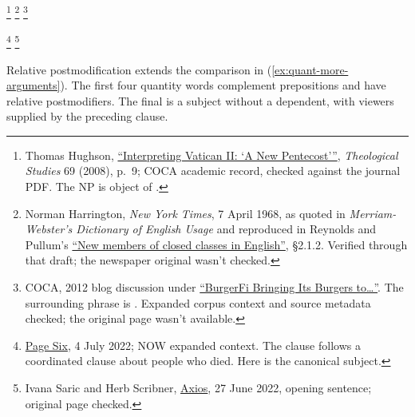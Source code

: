 \documentclass[12pt]{article}
\begin{document}
\ea\label{ex:quant-arguments}
\ea\label{ex:countless-part} \footnote{Thomas Hughson, \href{https://theologicalstudies.net/wp-content/uploads/2022/08/69.1.1.pdf\#page=7}{\enquote{Interpreting Vatican II: \enquote{A New Pentecost}}}, \textit{Theological Studies} 69 (2008), p.~9; COCA academic record, checked against the journal PDF. The NP is object of .}
\ex\label{ex:numerous-part} \footnote{Norman Harrington, \textit{New York Times}, 7 April 1968, as quoted in \textit{Merriam-Webster's Dictionary of English Usage} and reproduced in Reynolds and Pullum's \href{https://www.lel.ed.ac.uk/~gpullum/ClosedClasses.pdf}{\enquote{New members of closed classes in English}}, §2.1.2. Verified through that draft; the newspaper original wasn't checked.}
\ex\label{ex:multiple-part} \footnote{COCA, 2012 blog discussion under \href{http://www.tonetoatl.com/2012/08/burgerfi-bringing-its-burgers-to.html}{\enquote{BurgerFi Bringing Its Burgers to\ldots}}. The surrounding phrase is . Expanded corpus context and source metadata checked; the original page wasn't available.}
\begin{samepage}
\ex\label{ex:numerous-subj} \footnote{\href{https://pagesix.com/2022/07/04/travis-scott-performs-in-miami-at-e11even/}{Page Six}, 4 July 2022; NOW expanded context. The clause follows a coordinated clause about people who died. Here  is the canonical subject.}
\ex\label{ex:multiple-subj} \footnote{Ivana Saric and Herb Scribner, \href{https://www.axios.com/2022/06/27/amtrak-train-derail-missouri}{Axios}, 27 June 2022, opening sentence; original page checked.}
\end{samepage}
\z\z

Relative postmodification extends the comparison in (\ref{ex:quant-more-arguments}). The first four quantity words complement prepositions and have relative postmodifiers. The final  is a subject without a dependent, with viewers supplied by the preceding clause.
\end{document}
